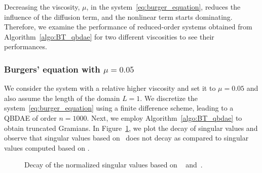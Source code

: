 Decreasing the viscosity, $\mu$, in the system~\eqref{eq:burger_equation}, reduces the influence of the diffusion term, and the nonlinear term  starts dominating. Therefore, we examine the performance of reduced-order systems obtained from Algorithm~\ref{algo:BT_qbdae} for two different viscosities to see their performances.
\renewcommand\thesubsubsection{\Alph{subsubsection}}
\subsubsection{Burgers' equation with $\mu = 0.05$}
We consider the system with a relative higher viscosity and set it to $\mu = 0.05$ and also assume the length of the domain $L = 1$. We discretize the system~\eqref{eq:burger_equation} using a finite difference scheme, leading to a QBDAE of order $n = 1000$. Next, we employ Algorithm~\ref{algo:BT_qbdae} to obtain truncated Gramians. In Figure~\ref{fig:SV_Burger}, we plot the decay of singular values and observe that singular values based on \GramQB~does not decay as compared to singular values computed based on \GramB.
\begin{figure}
\centering
\begin{center}
\end{center}
	\setlength\fheight{3cm}
	\setlength\fwidth{6cm}
	
	\caption{Decay of the normalized singular values based on \GramQB~ and~\GramB.}
	\label{fig:SV_Burger}
\end{figure}

